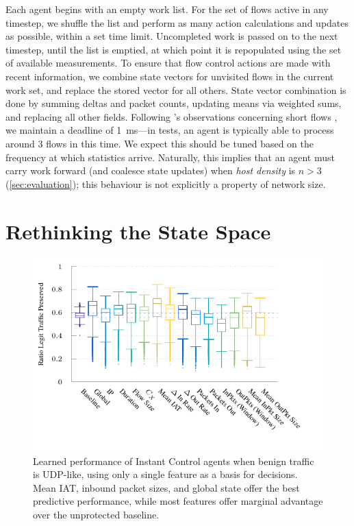 \documentclass[10pt, times, comsoc]{IEEEtran}
\begin{document}
Each agent begins with an empty work list.
For the set of flows active in any timestep, we shuffle the list and perform as many action calculations and updates as possible, within a set time limit.
Uncompleted work is passed on to the next timestep, until the list is emptied, at which point it is repopulated using the set of available measurements.
To ensure that flow control actions are made with recent information, we combine state vectors for unvisited flows in the current work set, and replace the stored vector for all others.
State vector combination is done by summing deltas and packet counts, updating means via weighted sums, and replacing all other fields.
Following \citeauthor{DBLP:conf/sigcomm/ChenL0L18}'s observations concerning short flows \cite{DBLP:conf/sigcomm/ChenL0L18}, we maintain a deadline of \SI{1}{\milli\second}---in tests, an agent is typically able to process around 3 flows in this time.
We expect this should be tuned based on the frequency at which statistics arrive.
\cbstart
{\color{revisiontext}Naturally, this implies that an agent must carry work forward (and coalesce state updates) when \emph{host density} is $n>3$ (\cref{sec:evaluation}); this behaviour is not explicitly a property of network size.}
\cbend

\section{Rethinking the State Space}\label{sec:rethinking-the-state-space}

\begin{figure}
	\centering
	\includegraphics[width=0.65\linewidth]{../plots/ftprep-cap-box}
	\vspace{-0.75cm}
	\caption{
		Learned performance of Instant Control agents when benign traffic is UDP-like, using only a single feature as a basis for decisions.
		Mean IAT, inbound packet sizes, and global state offer the best predictive performance, while most features offer marginal advantage over the unprotected baseline.
		\label{fig:udp-feature-plots}
	}
\vspace{-0.4cm}
\end{figure}
\end{document}
